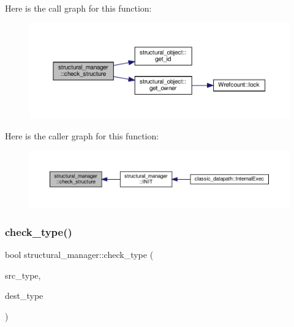 Here is the call graph for this function\+:
\nopagebreak
\begin{figure}[H]
\begin{center}
\leavevmode
\includegraphics[width=350pt]{d7/d6b/classstructural__manager_af27b22e329e469a02e83f1066f5a3184_cgraph}
\end{center}
\end{figure}
Here is the caller graph for this function\+:
\nopagebreak
\begin{figure}[H]
\begin{center}
\leavevmode
\includegraphics[width=350pt]{d7/d6b/classstructural__manager_af27b22e329e469a02e83f1066f5a3184_icgraph}
\end{center}
\end{figure}
\mbox{\label{classstructural__manager_a939e3ab0ee909c9008fc787d399a117c}} 
\subsubsection{\texorpdfstring{check\+\_\+type()}{check\_type()}}
{\footnotesize\ttfamily bool structural\+\_\+manager\+::check\+\_\+type (\begin{DoxyParamCaption}\item[{\hyperlink{structural__objects_8hpp_a8ea5f8cc50ab8f4c31e2751074ff60b2}{structural\+\_\+object\+Ref}}]{src\+\_\+type,  }\item[{\hyperlink{structural__objects_8hpp_a8ea5f8cc50ab8f4c31e2751074ff60b2}{structural\+\_\+object\+Ref}}]{dest\+\_\+type }\end{DoxyParamCaption})\hspace{0.3cm}{\ttfamily [private]}}




